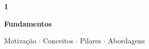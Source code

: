 \documentclass[aspectratio=169,10pt]{beamer}
\begin{document}
{
\begin{frame}[noframenumbering]
  \centering\vspace{1.0cm}
  {\fontsize{36}{44}\selectfont\bfseries\color{gemaBlue} 1}\par
  \vspace{0.22cm}
  {\Large\color{dpTeal}\bfseries Fundamentos}\par
  \vspace{0.14cm}
  {\color{gray}\small Motivação $\cdot$ Conceitos $\cdot$ Pilares $\cdot$ Abordagens}
\end{frame}
}

\end{document}
